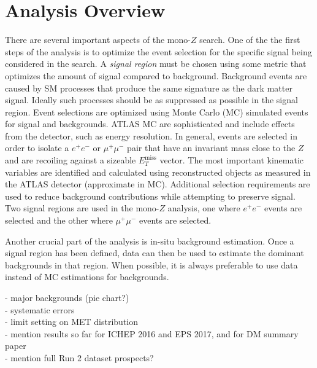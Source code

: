 \label{chapter:prevWork}

\section{Analysis Overview}

There are several important aspects of the mono-$Z$ search. One of the the first steps of the analysis is to optimize the event selection for the specific signal being considered in the search. A \textit{signal region} must be chosen using some metric that optimizes the amount of signal compared to background. Background events are caused by SM processes that produce the same signature as the dark matter signal. Ideally such processes should be as suppressed as possible in the signal region. Event selections are optimized using Monte Carlo (MC) simulated events for signal and backgrounds. ATLAS MC are sophisticated and include effects from the detector, such as energy resolution. In general, events are selected in order to isolate a $e^+e^-$ or $\mu^+\mu^-$ pair that have an invariant mass close to the $Z$ and are recoiling against a sizeable $E_{T}^{\text{miss}}$ vector. The most important kinematic variables are identified and calculated using reconstructed objects as measured in the ATLAS detector (approximate in MC). Additional selection requirements are used to reduce background contributions while attempting to preserve signal. Two signal regions are used in the mono-$Z$ analysis, one where $e^+e^-$ events are selected and the other where $\mu^+\mu^-$ events are selected.

Another crucial part of the analysis is in-situ background estimation. Once a signal region has been defined, data can then be used to estimate the dominant backgrounds in that region. When possible, it is always preferable to use data instead of MC estimations for backgrounds. 

- major backgrounds (pie chart?)\\
- systematic errors\\
- limit setting on MET distribution\\
- mention results so far for ICHEP 2016 and EPS 2017, and for DM summary paper\\
- mention full Run 2 dataset prospects?\\

